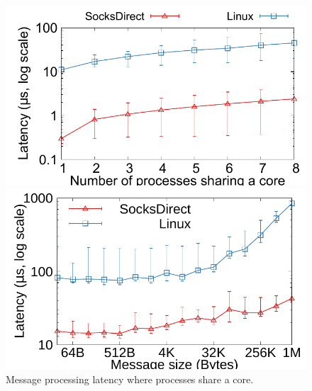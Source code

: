 \begin{figure}[t!]
	\centering
	\begin{minipage}{.31\textwidth}
		
		\centering \includegraphics[width=\textwidth]{eval/microbenchmark/sharecore-lat.pdf}
		\vspace{-15pt}
		\caption{Message processing latency where processes share a core.}
		\label{fig:eval-context-switch}
	\end{minipage}
	\hspace{0.02\textwidth}
	\begin{minipage}{.31\textwidth}
				\centering \includegraphics[width=\textwidth]{eval/web/msgsize-clocal-lat.pdf}

\end{minipage}
\end{figure}
